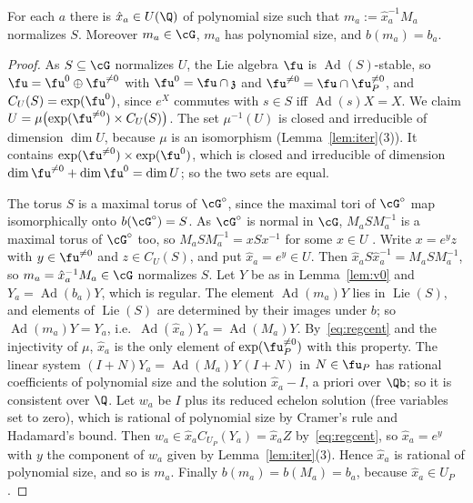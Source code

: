 \begin{lemma}\label{lem:xhat}
For each $a$ there is $\hat x_a\in U(\Q)$ of polynomial size such that $m_a:=\hat x_a^{-1}M_a$ normalizes
$S$. Moreover $m_a\in\cG$, $m_a$ has polynomial size, and $b(m_a)=b_a$.
\end{lemma}
\begin{proof}
As $S\subseteq\cG$ normalizes $U$, the Lie algebra $\fu$ is $\operatorname{Ad}(S)$-stable, so
$\fu=\fu^0\oplus\fu^{\ne0}$ with $\fu^0=\fu\cap\mathfrak z$ and $\fu^{\ne0}=\fu\cap\fu_P^{\ne0}$, and
$C_U(S)=\exp(\fu^0)$, since $e^X$ commutes with $s\in S$ iff $\operatorname{Ad}(s)X=X$. We claim
$U=\mu\bigl(\exp(\fu^{\ne0})\times C_U(S)\bigr)$. The set $\mu^{-1}(U)$ is closed and irreducible of dimension
$\dim U$, because $\mu$ is an isomorphism (Lemma~\ref{lem:iter}(3)). It contains
$\exp(\fu^{\ne0})\times\exp(\fu^0)$, which is closed and irreducible of dimension
$\dim\fu^{\ne0}+\dim\fu^0=\dim U$; so the two sets are equal.

The torus $S$ is a maximal torus of $\cG^\circ$, since the maximal tori of $\cG^\circ$ map isomorphically onto
$b(\cG^\circ)=S$. As $\cG^\circ$ is normal in $\cG$, $M_aSM_a^{-1}$ is a maximal torus of $\cG^\circ$ too, so
$M_aSM_a^{-1}=xSx^{-1}$ for some $x\in U$ \cite[10.6]{Bor91}. Write $x=e^yz$ with $y\in\fu^{\ne0}$ and
$z\in C_U(S)$, and put $\hat x_a=e^y\in U$. Then $\hat x_aS\hat x_a^{-1}=M_aSM_a^{-1}$, so
$m_a=\hat x_a^{-1}M_a\in\cG$ normalizes $S$. Let $Y$ be as in Lemma~\ref{lem:v0} and $Y_a=\operatorname{Ad}(b_a)Y$,
which is regular. The element $\operatorname{Ad}(m_a)Y$ lies in $\operatorname{Lie}(S)$, and elements of $\operatorname{Lie}(S)$ are determined by
their images under $b$; so $\operatorname{Ad}(m_a)Y=Y_a$, i.e.\ $\operatorname{Ad}(\hat x_a)Y_a=\operatorname{Ad}(M_a)Y$. By~\eqref{eq:regcent}
and the injectivity of $\mu$, $\hat x_a$ is the only element of $\exp(\fu_P^{\ne0})$ with this property.
The linear system $(I+N)Y_a=\operatorname{Ad}(M_a)Y\,(I+N)$ in $N\in\fu_P$ has rational coefficients of polynomial size
and the solution $\hat x_a-I$, a priori over $\Qb$; so it is consistent over $\Q$. Let $w_a$ be $I$ plus its
reduced echelon solution (free variables set to zero), which is rational of polynomial size by Cramer's
rule and Hadamard's bound. Then $w_a\in\hat x_aC_{U_P}(Y_a)=\hat x_aZ$ by~\eqref{eq:regcent}, so $\hat x_a=e^y$ with
$y$ the component of $w_a$ given by Lemma~\ref{lem:iter}(3). Hence $\hat x_a$ is rational of polynomial
size, and so is $m_a$. Finally $b(m_a)=b(M_a)=b_a$, because $\hat x_a\in U_P$.
\end{proof}

